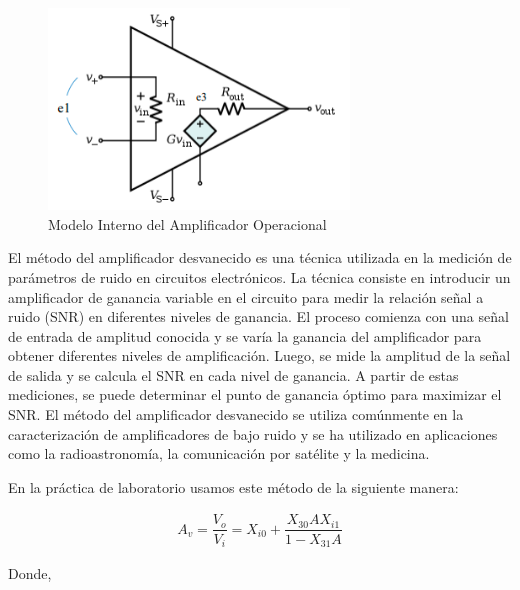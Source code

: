         \begin{figure}[H]
            \centering
            \includegraphics[width=8cm]{Imagenes/modelo_amp.png}
            \caption{Modelo Interno del Amplificador Operacional}
            \label{fig:modelo_amp}
        \end{figure}

        El método del amplificador desvanecido es una técnica utilizada en la medición de parámetros de ruido en circuitos electrónicos. La técnica consiste en introducir un amplificador de ganancia variable en el circuito para medir la relación señal a ruido (SNR) en diferentes niveles de ganancia. El proceso comienza con una señal de entrada de amplitud conocida y se varía la ganancia del amplificador para obtener diferentes niveles de amplificación. Luego, se mide la amplitud de la señal de salida y se calcula el SNR en cada nivel de ganancia. A partir de estas mediciones, se puede determinar el punto de ganancia óptimo para maximizar el SNR. El método del amplificador desvanecido se utiliza comúnmente en la caracterización de amplificadores de bajo ruido y se ha utilizado en aplicaciones como la radioastronomía, la comunicación por satélite y la medicina. 
        
        En la práctica de laboratorio usamos este método de la siguiente manera: 

        \begin{gather}
            A_v=\dfrac{V_o}{V_i}=X_{i0}+\dfrac{X_{30}AX_{i1}}{1-X_{31}A}
        \end{gather}

        Donde,

